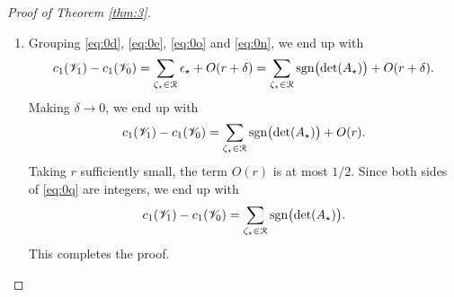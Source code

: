 \documentclass[11pt]{article}
\numberwithin{equation}{section}
\let\pazocal\EuScript
\theoremstyle{definition}
\DeclareMathOperator{\sgn}{sgn}
\newcommand{\RRR}{\pazocal{R}}
\newcommand{\VVV}{{\mathscr{V}}}
\newcommand{\R}{\mathbb{R}}
\newcommand{\txi}{{\tilde{\xi}}}
\newcommand{\tb}{{\tilde{b}}}
\newcommand{\matrice}[1]{\arraycolsep3.5pt\begin{bmatrix}#1\end{bmatrix}}
\begin{document}
\begin{proof}[Proof of Theorem \ref{thm:3}]
\begin{enumerate}
We define more appropriate coordinates
\begin{equation}\label{eq:0k}
\txi_1 = \dfrac{t_{12}\delta + t_{22}\xi_1}{t_{11}\delta}, \quad \txi_2 = \dfrac{t_{13}\delta + t_{23}\xi_1 + t_{33}\xi_2}{t_{11}\delta}.
\end{equation}
Using invariance of two-forms under change of coordinates, $b_0(\xi)d\xi = \tb_0(\txi)d\txi$, where $\tb_0(\pm \delta,\txi) d\xi$ is the two-form associated to the negative eigenspace of
\[
\epsilon_\star \delta \cdot t_{11} \bigl( \sigma_1 + \sigma_2 \txi_1 + \sigma_3 \txi_2 \bigr).
\]
This setup allows us to apply \cite[(23)]{FC13}, which gives:
\begin{equation*}
\tb_0(\pm \delta,\txi) = \dfrac{i\epsilon_\star^3 (\pm\delta)^3}{2\delta^3\bigl(\txi^2_1 + \txi_2^2 + 1\bigr)^{3/2}} \matrice{1 \\ \txi_1\\ \txi_2 } \cdot \matrice{0 \\ 1 \\ 0} \wedge \matrice{0 \\ 0 \\ 1} = \dfrac{\pm\epsilon_\star}{2\bigl(\txi^2_1 + \txi_2^2 + 1\bigr)^{3/2}}.
\end{equation*}
Under the change of coordinates \eqref{eq:0k}, the disk $|\xi| \leq r$ gets mapped to an ellipse centered at distance $O(1)$ from the origin, of dimensions $\sim \delta^{-1}$. Thus,
\begin{equation}\label{eq:0n}
\int_{|\xi| \leq r} b_0(\pm\delta,\xi) d\xi = \int_{\R^2} b_0(\pm\delta,\xi) d\xi + O(\delta) = \pm \epsilon_\star \pi + O(\delta).
\end{equation}
We refer to the proof of \cite[Lem.\,2.5]{D19b} for details.

\item
Grouping \eqref{eq:0d}, \eqref{eq:0e}, \eqref{eq:0o} and \eqref{eq:0n}, we end up with
\begin{equation*}
c_1(\VVV_1)-c_1(\VVV_0) = \sum_{\zeta_\star \in \RRR} \epsilon_\star + O(r+\delta) = \sum_{\zeta_\star \in \RRR} \sgn\bigl(\det(A_\star)\bigr) + O(r+\delta).
\end{equation*}
Making $\delta \to 0$, we end up with
\begin{equation}\label{eq:0q}
c_1(\VVV_1)-c_1(\VVV_0) = \sum_{\zeta_\star \in \RRR} \sgn\bigl(\det(A_\star)\bigr) + O(r).
\end{equation}
Taking $r$ sufficiently small, the term $O(r)$ is at most $1/2$. Since both sides of \eqref{eq:0q} are integers, we end up with
\begin{equation*}
c_1(\VVV_1)-c_1(\VVV_0) = \sum_{\zeta_\star \in \RRR} \sgn\bigl(\det(A_\star)\bigr).
\end{equation*}
This completes the proof.\qedhere
\end{enumerate}
\end{proof}
\end{document}
